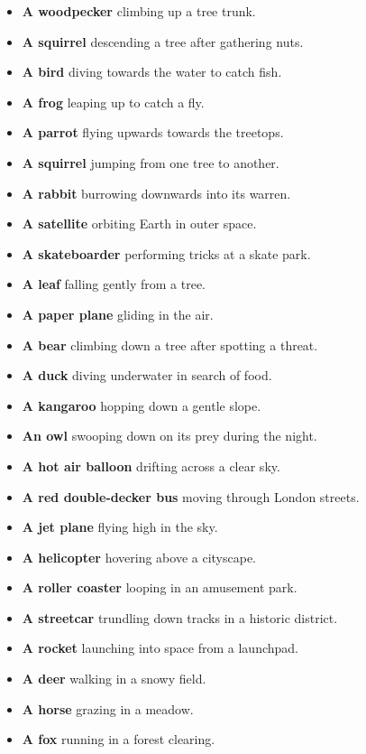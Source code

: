 \begin{itemize}
    \item \textbf{A woodpecker} climbing up a tree trunk.
    \item \textbf{A squirrel} descending a tree after gathering nuts.
    \item \textbf{A bird} diving towards the water to catch fish.
    \item \textbf{A frog} leaping up to catch a fly.
    \item \textbf{A parrot} flying upwards towards the treetops.
    \item \textbf{A squirrel} jumping from one tree to another.
    \item \textbf{A rabbit} burrowing downwards into its warren. 
    \item \textbf{A satellite} orbiting Earth in outer space.
    \item \textbf{A skateboarder} performing tricks at a skate park. 
    \item \textbf{A leaf} falling gently from a tree.
    \item \textbf{A paper plane} gliding in the air.
    \item \textbf{A bear} climbing down a tree after spotting a threat. 
    \item \textbf{A duck} diving underwater in search of food.
    \item \textbf{A kangaroo} hopping down a gentle slope.
    \item \textbf{An owl} swooping down on its prey during the night.
    \item \textbf{A hot air balloon} drifting across a clear sky.
    \item \textbf{A red double-decker bus} moving through London streets. 
    \item \textbf{A jet plane} flying high in the sky.
    \item \textbf{A helicopter} hovering above a cityscape.
    \item \textbf{A roller coaster} looping in an amusement park.
    \item \textbf{A streetcar} trundling down tracks in a historic district.
    \item \textbf{A rocket} launching into space from a launchpad.
    \item \textbf{A deer} walking in a snowy field.
    \item \textbf{A horse} grazing in a meadow.
    \item \textbf{A fox} running in a forest clearing.

\end{itemize}
